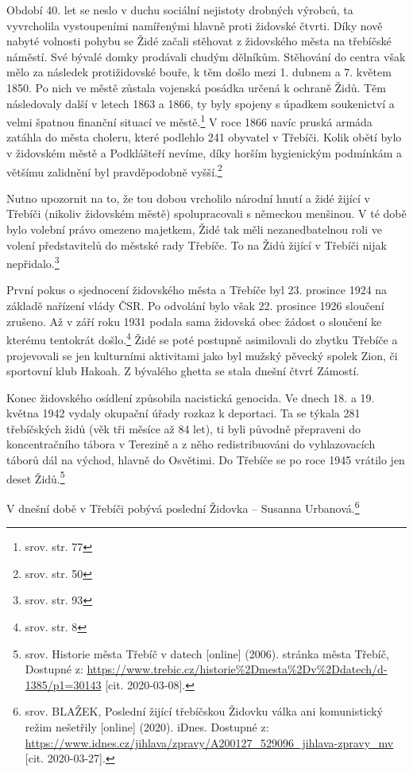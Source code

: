 \documentclass[a4paper,oneside,12pt]{report}
\begin{document}
Období 40. let se neslo v duchu sociální nejistoty drobných výrobců, ta vyvrcholila vystoupeními namířenými hlavně proti židovské čtvrti.
Díky nově nabyté volnosti pohybu se Židé začali stěhovat z židovského města na třebíčské náměstí.
Své bývalé domky prodávali chudým dělníkům.
Stěhování do centra však mělo za následek protižidovské bouře, k těm došlo mezi 1. dubnem a 7. květem 1850.
Po nich ve městě zůstala vojenská posádka určená k ochraně Židů.
Těm následovaly další v letech 1863 a 1866, ty byly spojeny s úpadkem soukenictví a velmi špatnou finanční situací ve městě.\footnote{srov. \cite{Janak1981} str. 77}
V roce 1866 navíc pruská armáda zatáhla do města choleru, které podlehlo 241 obyvatel v Třebíči.
Kolik obětí bylo v židovském městě a Podklášteří nevíme, díky horším hygienickým podmínkám a většímu zalidnění byl pravděpodobně vyšší.\footnote{srov.  str. 50}

Nutno upozornit na to, že tou dobou vrcholilo národní hnutí a židé žijící v Třebíči (nikoliv židovském městě) spolupracovali s německou menšinou.
V té době bylo volební právo omezeno majetkem, Židé tak měli nezanedbatelnou roli ve volení představitelů do městské rady Třebíče.
To na  Židů žijící v Třebíči nijak nepřidalo.\footnote{srov. \cite{Janak1981} str. 93}

První pokus o sjednocení židovského města a Třebíče byl 23. prosince 1924 na základě nařízení vlády ČSR.
Po odvolání bylo však 22. prosince 1926 sloučení zrušeno.
Až v září roku 1931 podala sama židovská obec žádost o sloučení ke kterému tentokrát došlo.\footnote{srov. \cite{Klenovsky2003} str. 8}
Židé se poté postupně asimilovali do zbytku Třebíče a projevovali se jen kulturními aktivitami jako byl mužský pěvecký spolek Zion, či sportovní klub Hakoah.
Z bývalého ghetta se stala dnešní čtvrť Zámostí.

Konec židovského osídlení způsobila nacistická genocida.
Ve dnech 18. a 19. května 1942 vydaly okupační úřady rozkaz k deportaci.
Ta se týkala 281 třebíčských židů (věk tři měsíce až 84 let), ti byli původně přepraveni do koncentračního tábora v Terezině a z něho redistribuováni do vyhlazovacích táborů dál na východ, hlavně do Osvětimi.
Do Třebíče se po roce 1945 vrátilo jen deset Židů.\footnote{srov. Historie města Třebíč v datech [online] (2006). stránka města Třebíč, Dostupné z: \url{https://www.trebic.cz/historie\%2Dmesta\%2Dv\%2Ddatech/d-1385/p1=30143} [cit. 2020-03-08]. }

V dnešní době v Třebíči pobývá poslední Židovka -- Susanna Urbanová.\footnote{srov. BLAŽEK, Poslední žijící třebíčskou Židovku válka ani komunistický režim nešetřily [online] (2020). iDnes. Dostupné z: \url{https://www.idnes.cz/jihlava/zpravy/A200127_529096_jihlava-zpravy_mv} [cit. 2020-03-27].}
\end{document}

